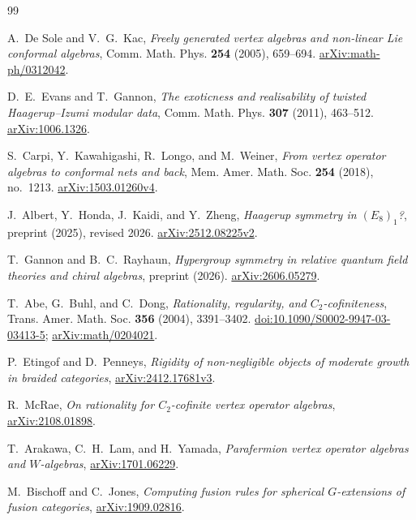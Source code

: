 \begin{thebibliography}{99}
\raggedright

A.~De Sole and V.~G.~Kac,
\emph{Freely generated vertex algebras and non-linear Lie conformal algebras},
Comm. Math. Phys. \textbf{254} (2005), 659--694.
\href{https://arxiv.org/abs/math-ph/0312042}{arXiv:math-ph/0312042}.

D.~E.~Evans and T.~Gannon,
\emph{The exoticness and realisability of twisted Haagerup--Izumi modular data},
Comm. Math. Phys. \textbf{307} (2011), 463--512.
\href{https://arxiv.org/abs/1006.1326}{arXiv:1006.1326}.

S.~Carpi, Y.~Kawahigashi, R.~Longo, and M.~Weiner,
\emph{From vertex operator algebras to conformal nets and back},
Mem. Amer. Math. Soc. \textbf{254} (2018), no.~1213.
\href{https://arxiv.org/abs/1503.01260v4}{arXiv:1503.01260v4}.

J.~Albert, Y.~Honda, J.~Kaidi, and Y.~Zheng,
\emph{Haagerup symmetry in $(E_8)_1$?}, preprint (2025), revised 2026.
\href{https://arxiv.org/abs/2512.08225v2}{arXiv:2512.08225v2}.

T.~Gannon and B.~C.~Rayhaun,
\emph{Hypergroup symmetry in relative quantum field theories and chiral algebras},
preprint (2026).
\href{https://arxiv.org/abs/2606.05279}{arXiv:2606.05279}.

T.~Abe, G.~Buhl, and C.~Dong,
\emph{Rationality, regularity, and $C_2$-cofiniteness},
Trans. Amer. Math. Soc. \textbf{356} (2004), 3391--3402.
\href{https://doi.org/10.1090/S0002-9947-03-03413-5}{doi:10.1090/S0002-9947-03-03413-5};
\href{https://arxiv.org/abs/math/0204021}{arXiv:math/0204021}.

P.~Etingof and D.~Penneys,
\emph{Rigidity of non-negligible objects of moderate growth in braided categories},
\href{https://arxiv.org/abs/2412.17681v3}{arXiv:2412.17681v3}.

R.~McRae,
\emph{On rationality for $C_2$-cofinite vertex operator algebras},
\href{https://arxiv.org/abs/2108.01898}{arXiv:2108.01898}.

T.~Arakawa, C.~H.~Lam, and H.~Yamada,
\emph{Parafermion vertex operator algebras and $W$-algebras},
\href{https://arxiv.org/abs/1701.06229}{arXiv:1701.06229}.

M.~Bischoff and C.~Jones,
\emph{Computing fusion rules for spherical $G$-extensions of fusion categories},
\href{https://arxiv.org/abs/1909.02816}{arXiv:1909.02816}.


\end{thebibliography}
